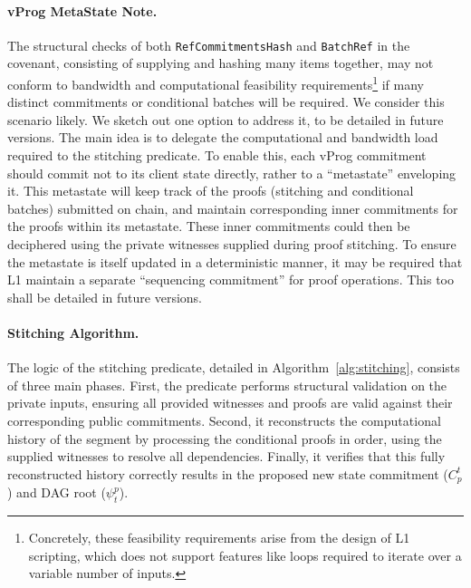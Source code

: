\documentclass[onecolumn, 9pt, a4paper]{extarticle}
\begin{document}
\paragraph{vProg MetaState Note.} The structural checks of both \texttt{RefCommitmentsHash} and \texttt{BatchRef} in the covenant, consisting of supplying and hashing many items together, may not conform to bandwidth and computational feasibility requirements\footnote{Concretely, these feasibility requirements arise from the design of L1 scripting, which does not support features like loops required to iterate over a variable number of inputs.} if many distinct commitments or conditional batches will be required. 
We consider this scenario likely. We sketch out one option to address it, to be detailed in future versions. The main idea is to delegate the computational and bandwidth load required to the stitching predicate.
To enable this, each vProg commitment should commit not to its client state directly, rather to a ``metastate'' enveloping it. This metastate will keep track of the proofs (stitching and conditional batches) submitted on chain, and maintain corresponding inner commitments for the proofs within its metastate. These inner commitments could then be deciphered using the private witnesses supplied during proof stitching. To ensure the metastate is itself updated in a deterministic manner, it may be required that L1 maintain a separate ``sequencing commitment'' for proof operations. This too shall be detailed in future versions.

\paragraph{Stitching Algorithm.} The logic of the stitching predicate, detailed in Algorithm~\ref{alg:stitching}, consists of three main phases. First, the predicate performs structural validation on the private inputs, ensuring all provided witnesses and proofs are valid against their corresponding public commitments. Second, it reconstructs the computational history of the segment by processing the conditional proofs in order, using the supplied witnesses to resolve all dependencies. Finally, it verifies that this fully reconstructed history correctly results in the proposed new state commitment ($C_p^t$) and DAG root ($\psi_t^p$).
\end{document}
